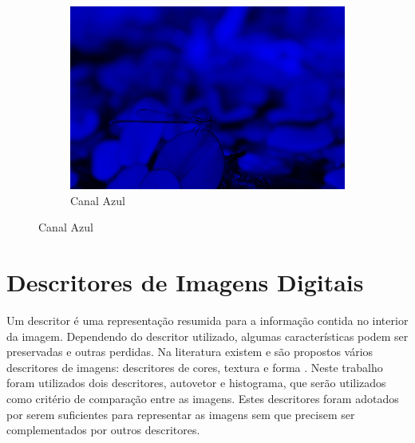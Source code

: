 \begin{figure}[htb]
\begin{center}
  \begin{subfigure}[b]{0.4\textwidth}
  \centering
    \includegraphics[scale=0.11]{images/blue.JPG}
    \caption{Canal Azul}
    \label{blue}
  \end{subfigure}
  
\end{center}

\end{figure}


\section{Descritores de Imagens Digitais}
Um descritor é uma representação resumida para a informação contida no interior da imagem. Dependendo do descritor utilizado, algumas características podem ser preservadas e outras perdidas. Na literatura existem e são propostos vários descritores de imagens: descritores de cores, textura e forma \cite{tuytelaars2008local, Gonzalez:2006:DIP:1076432}. Neste trabalho foram utilizados dois descritores, autovetor e histograma, que serão utilizados como critério de comparação entre as imagens. Estes descritores foram adotados por serem suficientes para representar as imagens sem que precisem ser complementados por outros descritores.

